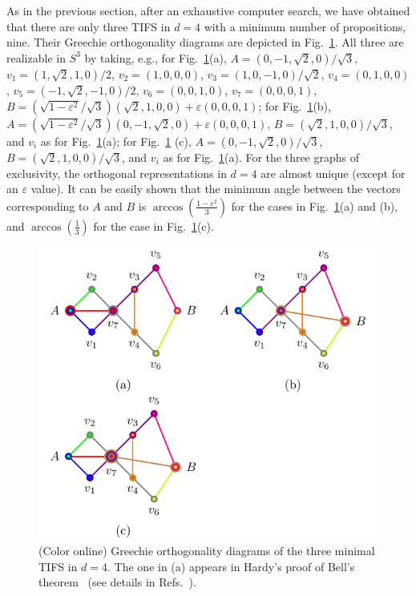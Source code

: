 \documentclass[%
 twocolumn,
 groupedaddress,
 showpacs,
 showkeys,
 preprintnumbers,
 amsmath,amssymb,
 aps,
 pra,
 longbibliography,
 floatfix,
 ]{revtex4-1}
\begin{document}
As in the previous section, after an exhaustive computer search,
we have obtained that there are only three TIFS in $d=4$ with a minimum number of propositions, nine. Their Greechie orthogonality diagrams are depicted in Fig.~\ref{fig:d4}. All three are realizable in $S^3$ by taking, e.g.,
		for Fig.~\ref{fig:d4}(a),
		$A = ({0,-1,\sqrt{2},0} )/\sqrt{3}$,
		$v_1 = ({1,\sqrt{2},1,0} )/ 2 $,
		$v_2 = ({1,0,0,0} )$,
		$v_3 = ({1,0,-1,0} )/\sqrt{2}$,
		$v_4 = ({0,1,0,0} ) $,
		$v_5 = ({-1,\sqrt{2},-1,0} )/ 2$,
		$v_6 = ({0,0,1,0} ) $,
		$v_7 = ({0,0,0,1} )$,
		$B = (\sqrt{1-\varepsilon^2} / \sqrt{3}) ({\sqrt{2},1,0,0})+\varepsilon({0,0,0,1})$;
		for Fig.~\ref{fig:d4}(b),
		$A = (\sqrt{1-\varepsilon^2} / \sqrt{3})({0,-1,\sqrt{2},0} )+\varepsilon({0,0,0,1})$,
		$B = ({\sqrt{2},1,0,0} )/\sqrt{3}$, and $v_i$ as for Fig.~\ref{fig:d4}(a);
		for Fig.~\ref{fig:d4} (c),
		$A = ({0,-1,\sqrt{2},0} )/\sqrt{3}$,
		$B = ({\sqrt{2},1,0,0} ) /\sqrt{3}$, and $v_i$ as for Fig.~\ref{fig:d4}(a).
For the three graphs of exclusivity, the orthogonal representations in $d=4$ are almost unique (except for an $\varepsilon$ value).
It can be easily shown that the minimum angle between the vectors corresponding to $A$ and $B$ is $\arccos\left(\frac{1-\varepsilon^2}{3}\right)$
for the cases in Fig.~\ref{fig:d4}(a) and (b), and $\arccos\left(\frac{1}{3}\right)$ for the case in Fig.~\ref{fig:d4}(c).


\begin{figure}[hbtp]
		\includegraphics[width=\columnwidth]{2018-minimalYIYS_pra_15REVISEDJR-Fig4.pdf}
	\caption{\label{fig:d4}
		(Color online)
		Greechie orthogonality diagrams of the three minimal
		TIFS in $d=4$. The one in (a) appears
		in Hardy's proof of Bell's theorem~\cite{Hardy93} (see details in Refs.\ \cite{CEG96,Cabello96,BBC11}).}
\end{figure}
\end{document}
